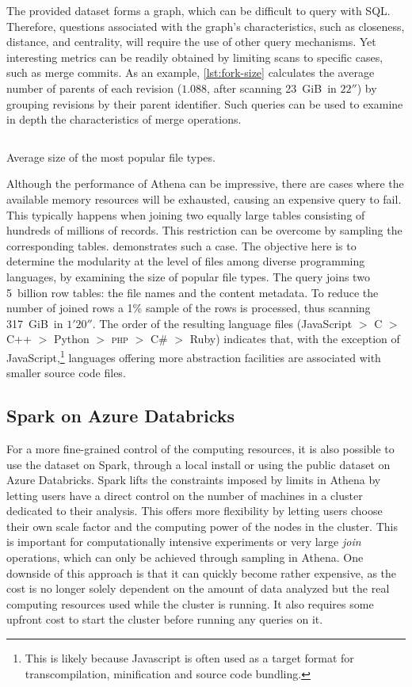 The provided dataset forms a graph, which can be difficult to query with SQL\@.
Therefore, questions associated with the graph's characteristics,
such as closeness, distance, and centrality, will require the use of
other query mechanisms.
Yet interesting metrics can be readily obtained by limiting scans
to specific cases, such as merge commits.
As an example, \cref{lst:fork-size} calculates the average
number of parents of each revision ($1.088$, after scanning 23~GiB\ in $22''$)
by grouping revisions by their parent identifier.
Such queries can be used to examine in depth the characteristics
of merge operations.

\begin{listing}
    \inputminted[firstline=4]{sql}{codesamples/graph-dataset/file-type-size.sql}
    \caption{Average size of the most popular file types.}%
    \label{lst:file-type-size}
\end{listing}

Although the performance of Athena can be impressive, there are cases where the
available memory resources will be exhausted, causing an expensive query to
fail.
This typically happens when joining two equally large tables consisting of
hundreds of millions of records.
This restriction can be overcome by sampling the corresponding tables.
 demonstrates such a case.
The objective here is to determine the modularity at the level of files among
diverse programming languages, by examining the size of popular file types.
The query joins two 5~billion row tables:
the file names and the content metadata.
To reduce the number of joined rows a 1\% sample of the rows is processed,
thus scanning 317~GiB\ in $1'20''$.
The order of the resulting language files
(JavaScript $>$ C $>$ C++ $>$ Python $>$ \textsc{php} $>$ C\# $>$ Ruby)
indicates that, with the exception of JavaScript,\footnote{This is likely
    because Javascript is often used as a target format for transcompilation,
    minification and source code bundling.} languages offering more abstraction
    facilities are associated with smaller source code files.

\subsection{Spark on Azure Databricks}

For a more fine-grained control of the computing resources, it is also possible
to use the dataset on Spark, through a local install or using the public
dataset on Azure Databricks. Spark lifts the constraints imposed by limits in
Athena by letting users have a direct control on the number of machines in a
cluster dedicated to their analysis. This offers more flexibility by letting
users choose their own scale factor and the computing power of the nodes in the
cluster.  This is important for computationally intensive experiments or very
large \emph{join} operations, which can only be achieved through sampling in
Athena. One downside of this approach is that it can quickly become rather
expensive, as the cost is no longer solely dependent on the amount of data
analyzed but the real computing resources used while the cluster is running. It
also requires some upfront cost to start the cluster before running any queries
on it.

